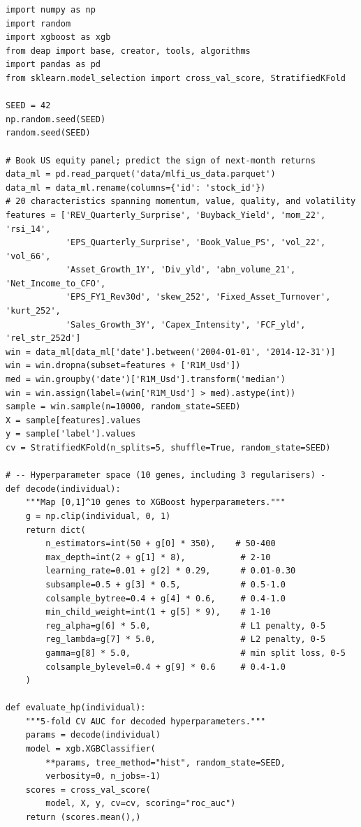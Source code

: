 \begin{verbatim}
import numpy as np
import random
import xgboost as xgb
from deap import base, creator, tools, algorithms
import pandas as pd
from sklearn.model_selection import cross_val_score, StratifiedKFold

SEED = 42
np.random.seed(SEED)
random.seed(SEED)

# Book US equity panel; predict the sign of next-month returns
data_ml = pd.read_parquet('data/mlfi_us_data.parquet')
data_ml = data_ml.rename(columns={'id': 'stock_id'})
# 20 characteristics spanning momentum, value, quality, and volatility
features = ['REV_Quarterly_Surprise', 'Buyback_Yield', 'mom_22', 'rsi_14',
            'EPS_Quarterly_Surprise', 'Book_Value_PS', 'vol_22', 'vol_66',
            'Asset_Growth_1Y', 'Div_yld', 'abn_volume_21', 'Net_Income_to_CFO',
            'EPS_FY1_Rev30d', 'skew_252', 'Fixed_Asset_Turnover', 'kurt_252',
            'Sales_Growth_3Y', 'Capex_Intensity', 'FCF_yld', 'rel_str_252d']
win = data_ml[data_ml['date'].between('2004-01-01', '2014-12-31')]
win = win.dropna(subset=features + ['R1M_Usd'])
med = win.groupby('date')['R1M_Usd'].transform('median')
win = win.assign(label=(win['R1M_Usd'] > med).astype(int))
sample = win.sample(n=10000, random_state=SEED)
X = sample[features].values
y = sample['label'].values
cv = StratifiedKFold(n_splits=5, shuffle=True, random_state=SEED)

# -- Hyperparameter space (10 genes, including 3 regularisers) -
def decode(individual):
    """Map [0,1]^10 genes to XGBoost hyperparameters."""
    g = np.clip(individual, 0, 1)
    return dict(
        n_estimators=int(50 + g[0] * 350),    # 50-400
        max_depth=int(2 + g[1] * 8),           # 2-10
        learning_rate=0.01 + g[2] * 0.29,      # 0.01-0.30
        subsample=0.5 + g[3] * 0.5,            # 0.5-1.0
        colsample_bytree=0.4 + g[4] * 0.6,     # 0.4-1.0
        min_child_weight=int(1 + g[5] * 9),    # 1-10
        reg_alpha=g[6] * 5.0,                  # L1 penalty, 0-5
        reg_lambda=g[7] * 5.0,                 # L2 penalty, 0-5
        gamma=g[8] * 5.0,                      # min split loss, 0-5
        colsample_bylevel=0.4 + g[9] * 0.6     # 0.4-1.0
    )

def evaluate_hp(individual):
    """5-fold CV AUC for decoded hyperparameters."""
    params = decode(individual)
    model = xgb.XGBClassifier(
        **params, tree_method="hist", random_state=SEED,
        verbosity=0, n_jobs=-1)
    scores = cross_val_score(
        model, X, y, cv=cv, scoring="roc_auc")
    return (scores.mean(),)


\end{verbatim}
